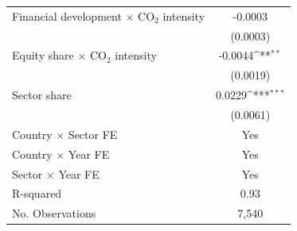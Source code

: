 {
\def\sym#1{\ifmmode^{#1}\else\(^{#1}\)\fi}
\begin{tabular}{l*{1}{c}}
Financial development $\times$ CO$_{2}$ intensity&     -0.0003         \\
                    &    (0.0003)         \\
Equity share $\times$ CO$_{2}$ intensity&     -0.0044\sym{**} \\
                    &    (0.0019)         \\
Sector share        &      0.0229\sym{***}\\
                    &    (0.0061)         \\
\hline \addlinespace[1ex] Country $\times$ Sector FE&         Yes         \\
Country $\times$ Year FE&         Yes         \\
Sector $\times$ Year FE&         Yes         \\
\hline \addlinespace[1ex] R-squared&        0.93         \\
No. Observations    &       7,540         \\
\end{tabular}
}

